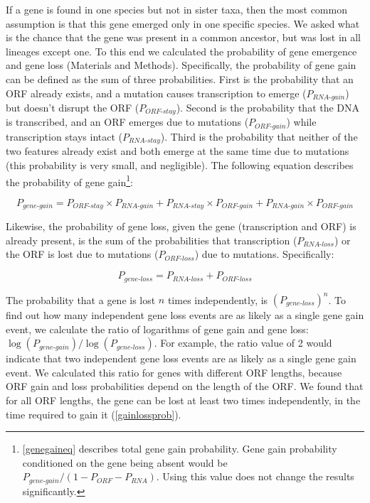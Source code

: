 \documentclass[12pt,a4paper]{article}
\begin{document}
If a gene is found in one species but not in sister taxa, then the most common assumption is that this gene emerged only in one specific species. We asked what is the chance that the gene was present in a common ancestor, but was lost in all lineages except one. To this end we calculated the probability of gene emergence and gene loss (Materials and Methods). Specifically, the probability of gene gain can be defined as the sum of three probabilities. First is the probability that an ORF already exists, and a mutation causes transcription to emerge ($P_\textit{RNA-gain}$) but doesn't disrupt the ORF ($P_\textit{ORF-stay}$). Second is the probability that the DNA is transcribed, and an ORF emerges due to mutations ($P_\textit{ORF-gain}$) while transcription stays intact ($P_\textit{RNA-stay}$). Third is the probability that neither of the two features already exist and both emerge at the same time due to mutations (this probability is very small, and negligible). The following equation describes the probability of gene gain\footnote{\autoref{genegaineq} describes total gene gain probability. Gene gain probability conditioned on the gene being absent would be $P_\textit{gene-gain}/(1-P_\textit{ORF} - P_\textit{RNA})$. Using this value does not change the results significantly.}:

\begin{equation}
P_\textit{gene-gain} = P_\textit{ORF-stay}\times P_\textit{RNA-gain} + P_\textit{RNA-stay}\times P_\textit{ORF-gain} + P_\textit{RNA-gain}\times P_\textit{ORF-gain}
\label{genegaineq}
\end{equation}

Likewise, the probability of gene loss, given the gene (transcription and ORF) is already present, is the sum of the probabilities that transcription ($P_\textit{RNA-loss}$) or the ORF is lost due to mutations ($P_\textit{ORF-loss}$) due to mutations. Specifically:

\begin{equation}
P_\textit{gene-loss} = P_\textit{RNA-loss} + P_\textit{ORF-loss}
\label{genelosseq}
\end{equation}

The probability that a gene is lost $n$ times independently, is $(P_\textit{gene-loss})^{n}$. To find out how many independent gene loss events are as likely as a single gene gain event, we calculate the ratio of logarithms of gene gain and gene loss: $\log(P_\textit{gene-gain})/\log(P_\textit{gene-loss})$. For example, the ratio value of 2 would indicate that two independent gene loss events are as likely as a single gene gain event. We calculated this ratio for genes with different ORF lengths, because ORF gain and loss probabilities depend on the length of the ORF. We found that for all ORF lengths, the gene can be lost at least two times independently, in the time required to gain it (\autoref{gainlossprob}). 
\end{document}
